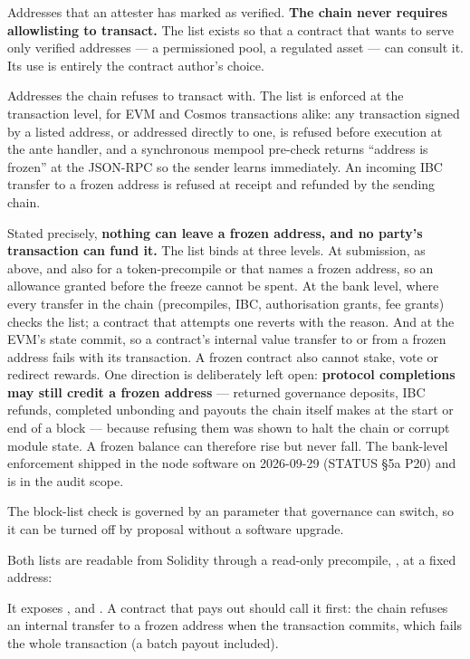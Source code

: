 \begin{description}[style=nextline]
\item[An allowlist (\code{isVerified}).] Addresses that an attester has marked
  as verified. \textbf{The chain never requires allowlisting to transact.} The
  list exists so that a contract that wants to serve only verified addresses
  --- a permissioned pool, a regulated asset --- can consult it. Its use is
  entirely the contract author's choice.
\item[A blocklist (\code{isFrozen}).] Addresses the chain refuses to transact
  with. The list is enforced at the transaction level, for EVM and Cosmos
  transactions alike: any transaction signed by a listed address, or addressed
  directly to one, is refused before execution at the ante handler, and a
  synchronous mempool pre-check returns ``address is frozen'' at the JSON-RPC
  so the sender learns immediately. An incoming IBC transfer to a frozen
  address is refused at receipt and refunded by the sending chain.

  Stated precisely, \textbf{nothing can leave a frozen address, and no
  party's transaction can fund it.} The list binds at three levels. At
  submission, as above, and also for a token-precompile  or
   that names a frozen address, so an allowance granted
  before the freeze cannot be spent. At the bank level, where every transfer
  in the chain (precompiles, IBC, authorisation grants, fee grants) checks
  the list; a contract that attempts one reverts with the reason. And at the
  EVM's state commit, so a contract's internal value transfer to or from a
  frozen address fails with its transaction. A frozen contract also cannot
  stake, vote or redirect rewards. One direction is deliberately left open:
  \textbf{protocol completions may still credit a frozen address} ---
  returned governance deposits, IBC refunds, completed unbonding and payouts
  the chain itself makes at the start or end of a block --- because refusing
  them was shown to halt the chain or corrupt module state. A frozen balance
  can therefore rise but never fall. The bank-level enforcement shipped in
  the node software on 2026-09-29 (STATUS \S5a P20) and is in the audit
  scope.

  The block-list check is governed by an  parameter that
  governance can switch, so it can be turned off by proposal without a
  software upgrade.
\end{description}

Both lists are readable from Solidity through a read-only precompile,
, at a fixed address:
\begin{center}
\end{center}
It exposes ,  and
. A contract that pays out should call it first: the
chain refuses an internal transfer to a frozen address when the transaction
commits, which fails the whole transaction (a batch payout included).

